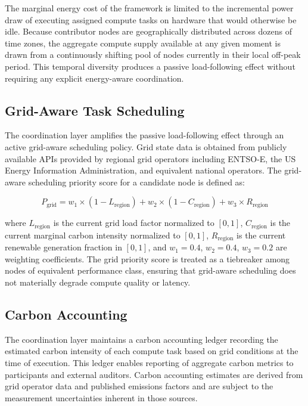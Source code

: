 \documentclass[12pt]{article}
\begin{document}
The marginal energy cost of the framework is limited to the incremental power draw of executing assigned compute tasks on hardware that would otherwise be idle. Because contributor nodes are geographically distributed across dozens of time zones, the aggregate compute supply available at any given moment is drawn from a continuously shifting pool of nodes currently in their local off-peak period. This temporal diversity produces a passive load-following effect without requiring any explicit energy-aware coordination.

\subsection{Grid-Aware Task Scheduling}

The coordination layer amplifies the passive load-following effect through an active grid-aware scheduling policy. Grid state data is obtained from publicly available APIs provided by regional grid operators including ENTSO-E, the US Energy Information Administration, and equivalent national operators. The grid-aware scheduling priority score for a candidate node is defined as:

\begin{equation}
P_{\text{grid}} = w_1 \times (1 - L_{\text{region}}) + w_2 \times (1 - C_{\text{region}}) + w_3 \times R_{\text{region}}
\label{eq:grid}
\end{equation}

where $L_{\text{region}}$ is the current grid load factor normalized to $[0,1]$, $C_{\text{region}}$ is the current marginal carbon intensity normalized to $[0,1]$, $R_{\text{region}}$ is the current renewable generation fraction in $[0,1]$, and $w_1 = 0.4$, $w_2 = 0.4$, $w_3 = 0.2$ are weighting coefficients. The grid priority score is treated as a tiebreaker among nodes of equivalent performance class, ensuring that grid-aware scheduling does not materially degrade compute quality or latency.

\subsection{Carbon Accounting}

The coordination layer maintains a carbon accounting ledger recording the estimated carbon intensity of each compute task based on grid conditions at the time of execution. This ledger enables reporting of aggregate carbon metrics to participants and external auditors. Carbon accounting estimates are derived from grid operator data and published emissions factors and are subject to the measurement uncertainties inherent in those sources.
\end{document}
